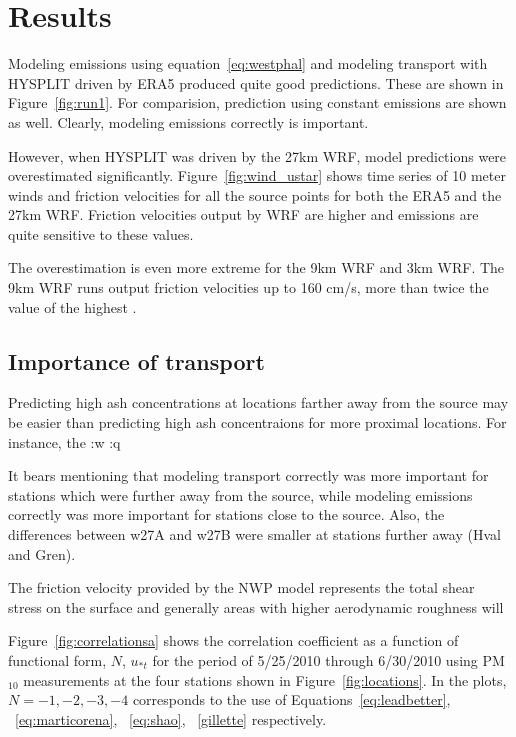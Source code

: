 
\section{Results}

Modeling emissions using equation~\ref{eq:westphal} and modeling transport with HYSPLIT driven by ERA5 produced quite good predictions. These are shown in Figure~\ref{fig:run1}.
For comparision, prediction using constant emissions are shown as well. Clearly, modeling emissions correctly is important.

However, when HYSPLIT was driven by the 27km WRF, model predictions were overestimated significantly. 
Figure~\ref{fig:wind_ustar} shows time series of 10 meter winds and friction velocities for all the source points for both the ERA5
and the 27km WRF. Friction velocities output by WRF are higher and emissions are quite sensitive to these values. 

The overestimation is even more extreme for the 9km WRF  and 3km WRF.
The 9km WRF runs output friction velocities up to 160 cm/s, more than twice the value of the highest .


\subsection{Importance of transport}

Predicting high ash concentrations at locations farther away from the source may be easier than predicting high ash concentraions for more proximal locations. For instance, the :w
:q

It bears mentioning that
modeling transport correctly was more important for stations which were further away from the source, while modeling emissions
correctly was more important for stations close to the source.
Also, the differences between w27A and w27B were smaller at stations further away (Hval and Gren). 

The friction velocity provided by the NWP model represents the total shear stress on the surface and generally areas with higher aerodynamic roughness will 


Figure~\ref{fig:correlationsa} shows the correlation coefficient as a function of functional form, $N$, $u_{*t}$ for the period
of 5/25/2010 through 6/30/2010 using PM$_{10}$ measurements at the four stations shown in Figure~\ref{fig:locations}.
In the plots, $N=-1, -2, -3, -4$ corresponds to the use of Equations~\ref{eq:leadbetter}, ~\ref{eq:marticorena}, ~\ref{eq:shao}, ~\ref{gillette} respectively.

